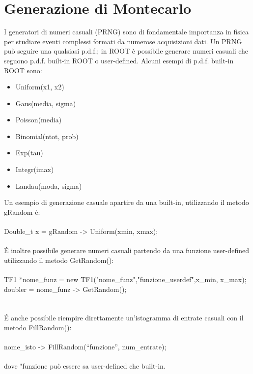 \documentclass[10pt,a4paper]{article}
\begin{document}
\section{Generazione di Montecarlo}\label{sec:montecarlo}
I generatori di numeri casuali (PRNG) sono di fondamentale importanza in fisica per studiare eventi complessi formati da numerose acquisizioni dati.
Un PRNG può seguire una qualsiasi p.d.f.; in ROOT è possibile generare numeri casuali che seguono p.d.f. built-in ROOT o user-defined. Alcuni esempi di p.d.f. built-in ROOT sono: 
\begin{itemize}
	\item Uniform(x1, x2)
	\item Gaus(media, sigma)
	\item Poisson(media)
	\item Binomial(ntot, prob)
	\item Exp(tau)
	\item Integr(imax)
	\item Landau(moda, sigma)
\end{itemize}
Un esempio di generazione casuale apartire da una built-in, utilizzando il metodo gRandom è:\\\\
Double\_t x = gRandom -> Uniform(xmin, xmax);\\\\
\'{E} inoltre possibile generare numeri casuali partendo da una funzione user-defined utilizzando il metodo GetRandom():\\\\
TF1 *nome\_funz = new TF1("nome\_funz","funzione\_userdef",x\_min, x\_max);\\
doubler = nome\_funz -> GetRandom();\\\\
\\\'{E} anche possibile riempire direttamente un'istogramma di entrate casuali con il metodo FillRandom():\\\\
 nome\_isto -> FillRandom(“funzione”, num\_entrate);\\\\
dove "funzione può essere sa user-defined che built-in.
\appendix
\end{document}
